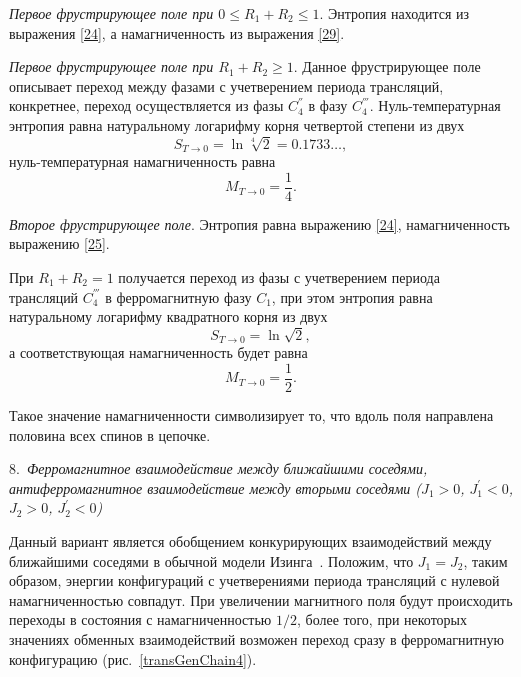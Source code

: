 \emph{Первое фрустрирующее поле при $0\leq R_1+R_2\leq 1$}. Энтропия находится из выражения \eqref{24}, а намагниченность из выражения \eqref{29}.

\emph{Первое фрустрирующее поле при $R_1 + R_2 \geqslant 1$}. Данное фрустрирующее поле описывает переход между фазами с учетверением периода трансляций, конкретнее, переход осуществляется из фазы $C_4^{''}$ в фазу $C_4^{'''}$. Нуль-температурная энтропия равна натуральному логарифму корня четвертой степени из двух
\begin{equation}
S_{T\rightarrow 0} = \ln \sqrt[4]{2} = 0.1733\dots,
\label{30}
\end{equation}
нуль-температурная намагниченность равна
\begin{equation}
M_{T\rightarrow 0} = \frac{1}{4}.
\label{31}
\end{equation}

\emph{Второе фрустрирующее поле}. Энтропия равна выражению \eqref{24}, намагниченность выражению \eqref{25}.

При $R_1 + R_2 = 1$ получается переход из фазы с учетверением периода трансляций $C_4^{'''}$ в ферромагнитную фазу $C_1$, при этом энтропия равна  натуральному логарифму квадратного корня из двух 
\begin{equation}
S_{T\rightarrow 0}=\ln \sqrt{2},
\label{32}
\end{equation}
а соответствующая намагниченность будет равна
\begin{equation}
M_{T\rightarrow 0} = \frac{1}{2}.
\label{33}
\end{equation}

Такое значение намагниченности символизирует то, что вдоль поля направлена половина всех спинов в цепочке.

8.~\emph{Ферромагнитное взаимодействие между ближайшими соседями, антиферромагнитное взаимодействие между вторыми соседями ($J_1>0$, $J_{1}^{'}<0$, $J_{2}>0$, $J_{2}^{'}<0$)}

Данный вариант является обобщением конкурирующих взаимодействий
между ближайшими соседями в обычной модели Изинга~\cite{zarubin2019}. Положим, что $J_1 = J_2$, таким образом, энергии конфигураций с учетверениями периода трансляций с нулевой намагниченностью совпадут. При увеличении магнитного поля будут происходить переходы в состояния с намагниченностью $1/2$, более того, при некоторых значениях обменных взаимодействий возможен переход сразу в ферромагнитную конфигурацию (рис.~\ref{transGenChain4}).

